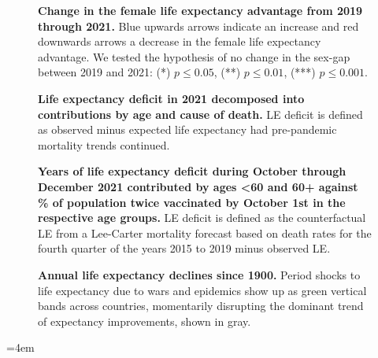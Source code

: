 \documentclass[12pt]{article}
\begin{document}
\begin{figure}[ht!]
    \centering
    \caption{\textbf{Change in the female life expectancy advantage from 2019 through 2021.} Blue upwards arrows indicate an increase and red downwards arrows a decrease in the female life expectancy advantage. We tested the hypothesis of no change in the sex-gap between 2019 and 2021: (*) $p\leq0.05$, (**) $p\leq0.01$, (***) $p\leq0.001$.}
    \label{fig:figure-3}
\end{figure}

\begin{figure}[ht!]
    \centering
    \caption{\textbf{Life expectancy deficit in 2021 decomposed into contributions by age and cause of death.} LE deficit is defined as observed minus expected life expectancy had pre-pandemic mortality trends continued.}
    \label{fig:figure-4}
\end{figure}

\begin{figure}[ht!]
    \centering
    \caption{\textbf{Years of life expectancy deficit during October through December 2021 contributed by ages <60 and 60+ against \% of population twice vaccinated by October 1st in the respective age groups.} LE deficit is defined as the counterfactual LE from a Lee-Carter mortality forecast based on death rates for the fourth quarter of the years 2015 to 2019 minus observed LE.}
    \label{fig:figure-5}
\end{figure}

\begin{figure}[ht!]
    \centering
    \caption{\textbf{Annual life expectancy declines since 1900.} Period shocks to life expectancy due to wars and epidemics show up as green vertical bands across countries, momentarily disrupting the dominant trend of expectancy improvements, shown in gray.}
    \label{fig:figure-6}
\end{figure}

\clearpage
\emergencystretch=4em
%
\end{document}
